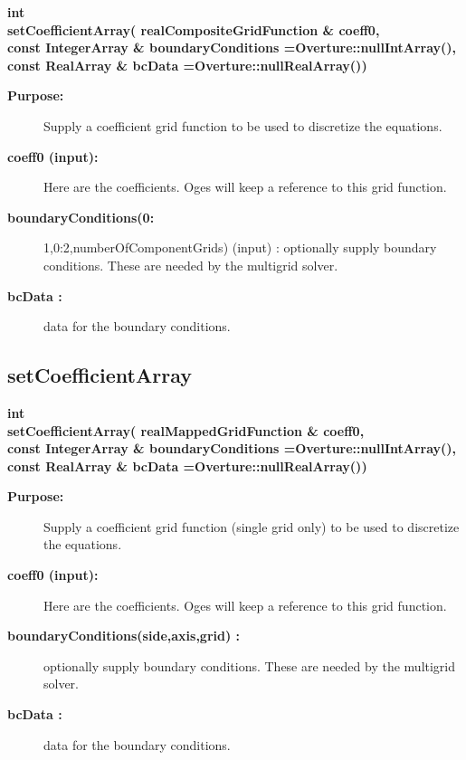 \begin{flushleft} \textbf{%
int  \\ 
\settowidth{\OgesIncludeArgIndent}{setCoefficientArray(}%
setCoefficientArray( realCompositeGridFunction \& coeff0,\\ 
const IntegerArray \& boundaryConditions  =Overture::nullIntArray(),\\ 
const RealArray \& bcData  =Overture::nullRealArray())
}\end{flushleft}
\begin{description}
\item[{\bf Purpose:}]  Supply a coefficient grid function to be used to discretize the equations.
\item[{\bf coeff0 (input):}]  Here are the coefficients. Oges will keep a reference to this
  grid function. 
\item[{\bf boundaryConditions(0:}] 1,0:2,numberOfComponentGrids) (input) : optionally supply boundary conditions.
  These are needed by the multigrid solver.
\item[{\bf bcData :}]  data for the boundary conditions.
\end{description}
\subsection{setCoefficientArray}
 
\begin{flushleft} \textbf{%
int  \\ 
\settowidth{\OgesIncludeArgIndent}{setCoefficientArray(}%
setCoefficientArray( realMappedGridFunction \& coeff0,\\ 
const IntegerArray \& boundaryConditions  =Overture::nullIntArray(),\\ 
const RealArray \& bcData  =Overture::nullRealArray())
}\end{flushleft}
\begin{description}
\item[{\bf Purpose:}]  Supply a coefficient grid function (single grid only)
  to be used to discretize the equations.
\item[{\bf coeff0 (input):}]  Here are the coefficients. Oges will keep a reference to this
  grid function.
\item[{\bf boundaryConditions(side,axis,grid) :}]  optionally supply boundary conditions. These are needed
   by the multigrid solver.
\item[{\bf bcData :}]  data for the boundary conditions.
\end{description}
